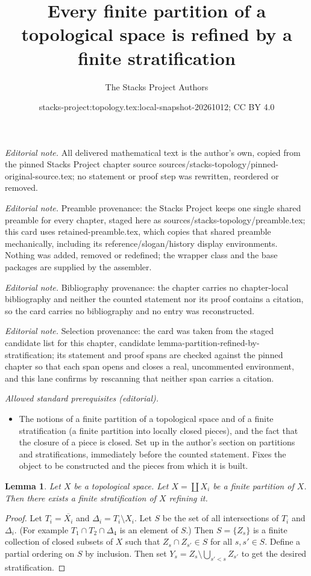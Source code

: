 \documentclass[10pt,a4paper]{amsart}
\title{Every finite partition of a topological space is refined by a finite stratification}
\author{The Stacks Project Authors}
\date{stacks-project:topology.tex:local-snapshot-20261012; CC BY 4.0}
\theoremstyle{plain}
\newtheorem{lemma}[subsection]{Lemma}
\theoremstyle{definition}
\theoremstyle{remark}
\numberwithin{equation}{subsection}
\begin{document}
\maketitle
\noindent\textit{Editorial note.} All delivered mathematical text is the author's own, copied from the pinned Stacks Project chapter source sources/stacks-topology/pinned-original-source.tex; no statement or proof step was rewritten, reordered or removed.\par\medskip
\noindent\textit{Editorial note.} Preamble provenance: the Stacks Project keeps one single shared preamble for every chapter, staged here as sources/stacks-topology/preamble.tex; this card uses retained-preamble.tex, which copies that shared preamble mechanically, including its reference/slogan/history display environments. Nothing was added, removed or redefined; the wrapper class and the base packages are supplied by the assembler.\par\medskip
\noindent\textit{Editorial note.} Bibliography provenance: the chapter carries no chapter-local bibliography and neither the counted statement nor its proof contains a citation, so the card carries no bibliography and no entry was reconstructed.\par\medskip
\noindent\textit{Editorial note.} Selection provenance: the card was taken from the staged candidate list for this chapter, candidate lemma-partition-refined-by-stratification; its statement and proof spans are checked against the pinned chapter so that each span opens and closes a real, uncommented environment, and this lane confirms by rescanning that neither span carries a citation.\par\medskip
\noindent\textit{Allowed standard prerequisites (editorial).}\begin{itemize}
\item The notions of a finite partition of a topological space and of a finite stratification (a finite partition into locally closed pieces), and the fact that the closure of a piece is closed. Set up in the author's section on partitions and stratifications, immediately before the counted statement. Fixes the object to be constructed and the pieces from which it is built.
\end{itemize}\medskip
\begin{lemma}
\label{lemma-partition-refined-by-stratification}
Let $X$ be a topological space. Let $X = \coprod X_i$ be a finite partition
of $X$. Then there exists a finite stratification of $X$ refining it.
\end{lemma}

\begin{proof}
Let $T_i = \overline{X_i}$ and $\Delta_i = T_i \setminus X_i$.
Let $S$ be the set of all intersections of $T_i$ and $\Delta_i$.
(For example $T_1 \cap T_2 \cap \Delta_4$ is an element of $S$.)
Then $S = \{Z_s\}$ is a finite collection of closed subsets of $X$ such that
$Z_s \cap Z_{s'} \in S$ for all $s, s' \in S$. Define a partial ordering
on $S$ by inclusion. Then set $Y_s = Z_s \setminus \bigcup_{s' < s} Z_{s'}$
to get the desired stratification.
\end{proof}
\end{document}
